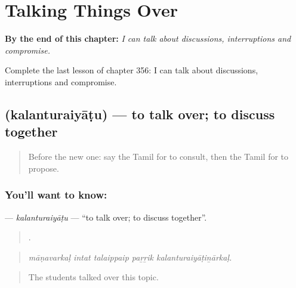 
\chapter{Talking Things Over}
\label{ch:ta-talking-things-over}

\begin{chapteropening}
\textbf{By the end of this chapter:} \emph{I can talk about discussions, interruptions and compromise.}

Complete the last lesson of chapter 356: I can talk about discussions, interruptions and compromise.
\end{chapteropening}

\section[\texorpdfstring{\ta{கலந்துரையாடு} (kalanturaiyāṭu)}{கலந்துரையாடு (kalanturaiyāṭu)}]{ (kalanturaiyāṭu) — to talk over; to discuss together}

\label{lesson:TA-C356-kalanturaiyatu}



\begin{quote}
Before the new one: say the Tamil for to consult, then the Tamil for to propose.
\end{quote}

\subsection*{You'll want to know: }
\textbf{} — \emph{kalanturaiyāṭu} — \textquotedblleft{}to talk over; to discuss together\textquotedblright{}.

\begin{quote}
    .
\end{quote}

\begin{quote}
\emph{māṇavarkaḷ intat talaippaip paṟṟik kalanturaiyāṭiṉārkaḷ.}
\end{quote}

\begin{quote}
The students talked over this topic.
\end{quote}

